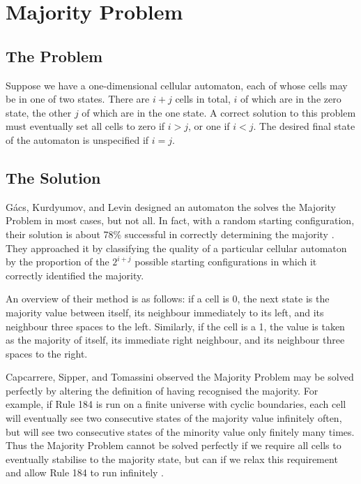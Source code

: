 \documentclass[11pt,a4paper]{article}
\begin{document}
\section{Majority Problem}
    \subsection{The Problem}
    Suppose we have a one-dimensional cellular automaton, each of whose cells
    may be in one of two states. There are $i+j$ cells in total, $i$ of which
    are in the zero state, the other $j$ of which are in the one state. A
    correct solution to this problem must eventually set all cells to zero if $i
    > j$, or one if $i < j$. The desired final state of the automaton is
    unspecified if $i = j$.

    \subsection{The Solution}
    G\'acs, Kurdyumov, and Levin designed an automaton the solves the Majority
    Problem in most cases, but not all. In fact, with a random starting
    configuration, their solution is about 78\% successful in correctly
    determining the majority \cite{GKL_majority}. They approached it by
    classifying the quality of a particular cellular automaton by the proportion
    of the $2^{i+j}$ possible starting configurations in which it correctly
    identified the majority.

    An overview of their method is as follows: if a cell is 0, the next state is
    the majority value between itself, its neighbour immediately to its left,
    and its neighbour three spaces to the left. Similarly, if the cell is a 1,
    the value is taken as the majority of itself, its immediate right neighbour,
    and its neighbour three spaces to the right.

    Capcarrere, Sipper, and Tomassini observed \cite{CST_majority} the Majority
    Problem may be solved perfectly by altering the definition of having
    recognised the majority. For example, if Rule 184 is run on a finite
    universe with cyclic boundaries, each cell will eventually see two
    consecutive states of the majority value infinitely often, but will see two
    consecutive states of the minority value only finitely many times. Thus the
    Majority Problem cannot be solved perfectly if we require all cells to
    eventually stabilise to the majority state, but can if we relax this
    requirement and allow Rule 184 to run infinitely \cite{LB_majority}.


\end{document}
